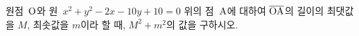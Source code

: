 원점~$\mathrm{O}$와 원~$x^2+y^2-2x-10y+10=0$ 위의 점~$\mathrm{A}$에 대하여 $\overline{\mathrm{OA}}$의 길이의 최댓값을 $M$, 최솟값을 $m$이라 할 때, $M^2+m^2$의 값을 구하시오.
